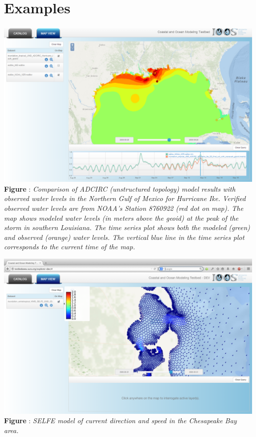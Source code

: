 \documentclass[noback,noborder,portrait,twocolumn]{cuposter}
\begin{document}
\section{Examples}
\begin{minipage}[t]{\linewidth}
  \centering
  \includegraphics[width=\linewidth]{../figs/SciWMS_ModelObsComparison}
  \textbf{Figure \getIncFigcounter{}}: \textit{Comparison of ADCIRC
    (unstructured topology) model results with observed water levels
    in the Northern Gulf of Mexico for Hurricane Ike. Verified
    observed water levels are from NOAA's Station 8760922 (red dot on
    map). The map shows modeled water levels (in meters above the
    geoid) at the peak of the storm in southern Louisiana. The time
    series plot shows both the modeled (green) and observed (orange)
    water levels. The vertical blue line in the time series plot
    corresponds to the current time of the map.}
\end{minipage}
\figspace{}
\begin{minipage}[t]{\linewidth}
  \centering
  \includegraphics[width=\linewidth]{../figs/vims_selfe_ubaratropic_vbaratropic_chesapeake_bay}
  \textbf{Figure \getIncFigcounter{}}: \textit{SELFE model of current
    direction and speed in the Chesapeake Bay area.}
\end{minipage}
\end{document}
